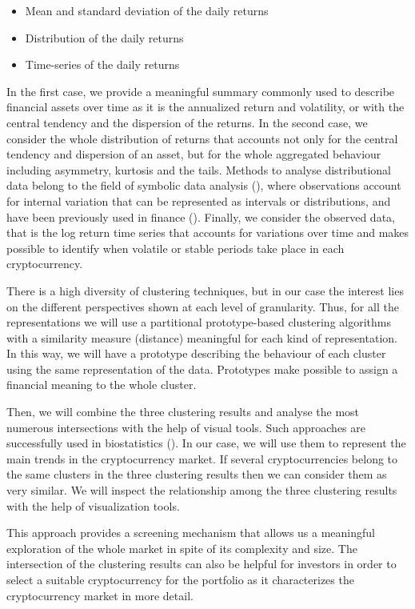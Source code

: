 \documentclass{bmcart}
\begin{document}
\begin{itemize}
	\item Mean and standard deviation of the daily returns
	\item Distribution of the daily returns
	\item Time-series of the daily returns 
\end{itemize}

In the first case, we provide a meaningful summary commonly used to describe financial assets over time as it is the annualized return and volatility, or with the central tendency and the  dispersion of the returns. In the second case, we consider the whole distribution of returns that accounts not only for the central tendency and dispersion of an asset, but for the whole aggregated behaviour including asymmetry, kurtosis and the tails. Methods to analyse distributional data belong to the field of symbolic data analysis (\cite{NoirhommeBrito2011}), where observations account for internal variation that can be represented as intervals or distributions, and have been previously used in finance (\cite{Arroyo2009, Arroyo2011, GONZALEZRIVERA2012}). Finally, we  consider the observed data, that is the log return time series that accounts for variations over time and makes possible to identify when volatile or stable periods take place in each cryptocurrency. 

There is a high diversity of clustering techniques, but in our case the interest lies on the different perspectives shown at each level of granularity. Thus, for all the representations we will use a partitional prototype-based clustering algorithms with a similarity measure (distance) meaningful for each kind of representation. In this way, we will have a prototype describing the behaviour of each cluster using the same representation of the data. Prototypes make possible to assign a financial meaning to the whole cluster. 

Then, we will combine the three clustering results and analyse the most numerous intersections with the help of visual tools. Such approaches are successfully used in biostatistics (\cite{l2015xclusim, kern2017interactive}). In our case, we will use them to represent the main trends in the cryptocurrency market. If several cryptocurrencies belong to the same clusters in the three clustering results then we can consider them as very similar. We will inspect the relationship among the three clustering results with the help of visualization tools. 

This approach provides a screening mechanism that allows us a meaningful exploration of the whole market in spite of its complexity and size. The intersection of the clustering results can also be helpful for investors in order to select a suitable cryptocurrency for the portfolio as it characterizes the cryptocurrency market in more detail.
\end{document}
